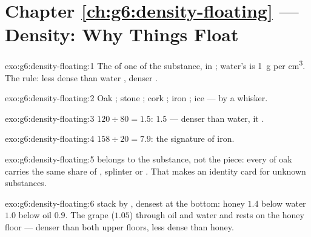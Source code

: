 \section*{Chapter \ref{ch:g6:density-floating} --- Density: Why Things Float}

\begin{solution}{exo:g6:density-floating:1}
The  of one  of the substance, in ;
water's is \qty{1}{g} per \unit{cm^3}. The rule: less dense than
water , denser .
\end{solution}

\begin{solution}{exo:g6:density-floating:2}
Oak ; stone ; cork ; iron ; ice  ---
by a whisker.
\end{solution}

\begin{solution}{exo:g6:density-floating:3}
$120 \div 80 = 1.5$:  $1.5$ --- denser than water, it
.
\end{solution}

\begin{solution}{exo:g6:density-floating:4}
$158 \div 20 = 7.9$: the signature of iron.
\end{solution}

\begin{solution}{exo:g6:density-floating:5}
 belongs to the substance, not the piece: every  of oak carries the same share of , splinter or
. That makes  an identity card for unknown substances.
\end{solution}

\begin{solution}{exo:g6:density-floating:6}
 stack by , densest at the bottom: honey $1.4$
below water $1.0$ below oil $0.9$. The grape ($1.05$) 
through oil and water and rests on the honey floor --- denser
than both upper floors, less dense than honey.
\end{solution}

